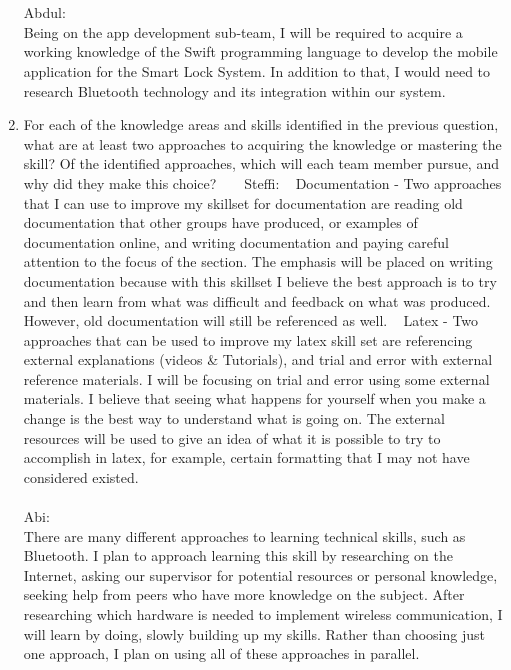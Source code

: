 \documentclass[12pt]{article}
\begin{document}
\begin{enumerate}
  \\
\\
Abdul:
\\ 
 Being on the app development sub-team, I will be required to acquire a working knowledge of the Swift programming language to develop the mobile application for the Smart Lock System.  In addition to that, I would need to research Bluetooth technology and its integration within our system.
 
 
  \item For each of the knowledge areas and skills identified in the previous
  question, what are at least two approaches to acquiring the knowledge or
  mastering the skill?  Of the identified approaches, which will each team
  member pursue, and why did they make this choice?
    ~\newline
    ~\newline
Steffi: 
  ~\newline
 Documentation - Two approaches that I can use to improve my skillset for documentation are reading old documentation that other groups have produced, or examples of documentation online, and writing documentation and paying careful attention to the focus of the section.  The emphasis will be placed on writing documentation because with this skillset I believe the best approach is to try and then learn from what was difficult and feedback on what was produced.  However, old documentation will still be referenced as well. 
  ~\newline
  Latex - Two approaches that can be used to improve my latex skill set are referencing external explanations (videos \& Tutorials), and trial and error with external reference materials.  I will be focusing on trial and error using some external materials.  I believe that seeing what happens for yourself when you make a change is the best way to understand what is going on.  The external resources will be used to give an idea of what it is possible to try to accomplish in latex, for example, certain formatting that I may not have considered existed. 
\\
\\
Abi:
\\ There are many different approaches to learning technical skills, such as Bluetooth.  I plan to approach learning this skill by researching on the Internet, asking our supervisor for potential resources or personal knowledge, seeking help from peers who have more knowledge on the subject.  After researching which hardware is needed to implement wireless communication, I will learn by doing, slowly building up my skills. Rather than choosing just one approach, I plan on using all of these approaches in parallel. 

\end{enumerate}
\end{document}
